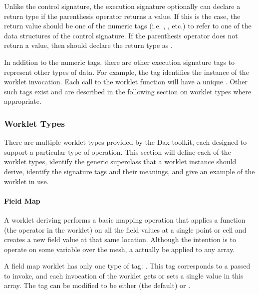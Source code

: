Unlike the control signature, the execution signature optionally can
declare a return type if the parenthesis operator returns a value. If this
is the case, the return value should be one of the numeric tags
(i.e. , , etc.) to refer to one of the data
structures of the control signature. If the parenthesis operator does not
return a value, then \executionsignature should declare the return type as
.

In addition to the numeric tags, there are other execution signature tags
to represent other types of data. For example, the  tag
identifies the instance of the worklet invocation. Each call to the worklet
function will have a unique . Other such tags exist and are
described in the following section on worklet types where appropriate.


\subsubsection{Worklet Types}


There are multiple worklet types provided by the Dax toolkit, each designed
to support a particular type of operation. This section will define each of
the worklet types, identify the generic superclass that a worklet instance
should derive, identify the signature tags and their meanings, and give an
example of the worklet in use.

\paragraph{Field Map}


A worklet deriving  performs a basic mapping
operation that applies a function (the operator in the worklet) on all the
field values at a single point or cell and creates a new field value at
that same location. Although the intention is to operate on some variable
over the mesh, a  actually be applied to any
array.

A field map worklet has only one type of \controlsignature tag:
. This tag corresponds to a  passed to
invoke, and each invocation of the worklet gets or sets a single value in
this array. The  tag can be modified to be either 
(the default) or .

